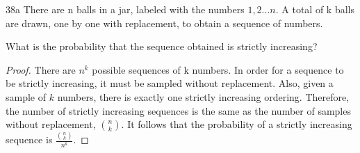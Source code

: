 \begin{exercise}{38a}
    There are n balls in a jar, labeled with the numbers $1,2\dots n$. A total of k balls are
drawn, one by one with replacement, to obtain a sequence of numbers.

 What is the probability that the sequence obtained is strictly increasing?
\end{exercise}

\begin{proof}
    There are $n^k$ possible sequences of k numbers. In order for a sequence to be strictly increasing, it must be sampled without replacement. Also, given a sample of $k$ numbers, there is exactly one strictly increasing ordering. Therefore, the number of strictly increasing sequences is the same as the number of samples without replacement, $n \choose k$. It follows that the probability of a strictly increasing sequence is $\frac{{n \choose k}}{n^k}$.
    
\end{proof}

